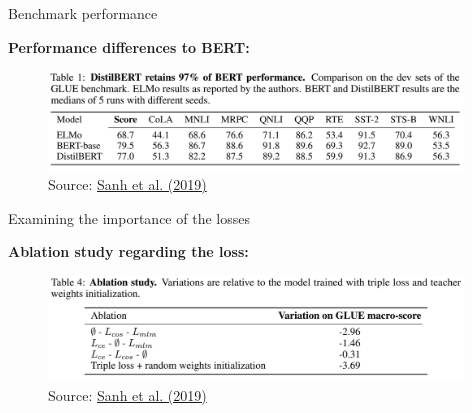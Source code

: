 
\begin{frame}{Benchmark performance}

\vfill

	\textbf{Performance differences to BERT:}

	\begin{figure}
		\centering
		\includegraphics[width = 11cm]{figure/distilbert-vs-sota.png}\\ 
		\footnotesize{Source:} \href{https://arxiv.org/pdf/1910.01108.pdf}{\footnotesize Sanh et al. (2019)}
	\end{figure}

\vfill

\end{frame}


\begin{frame}{Examining the importance of the losses}

\vfill

	\textbf{Ablation study regarding the loss:}

	\begin{figure}
		\centering
		\includegraphics[width = 11cm]{figure/distilbert-ablation.png}\\ 
		\footnotesize{Source:} \href{https://arxiv.org/pdf/1910.01108.pdf}{\footnotesize Sanh et al. (2019)}
	\end{figure}

\vfill
	
\end{frame}


